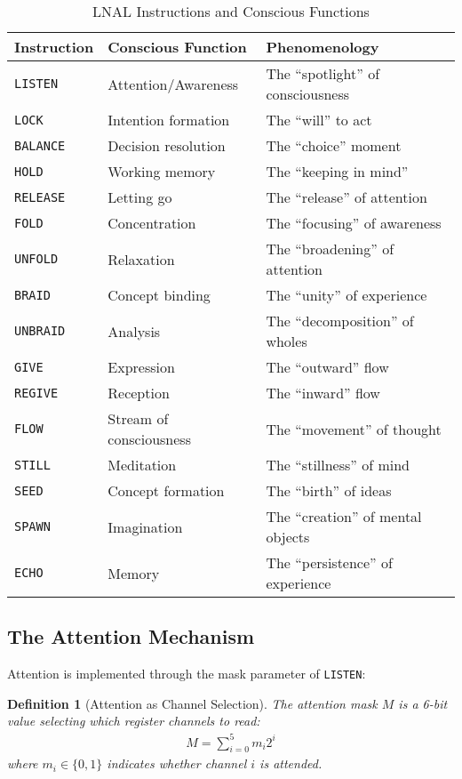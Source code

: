 \documentclass[12pt,a4paper]{article}
\newtheorem{definition}[theorem]{Definition}
\newcommand{\opcmd}[1]{\texttt{#1}}
\begin{document}
\begin{table}[H]
\centering
\caption{LNAL Instructions and Conscious Functions}
\begin{tabular}{lll}
\toprule
\textbf{Instruction} & \textbf{Conscious Function} & \textbf{Phenomenology} \\
\midrule
\opcmd{LISTEN} & Attention/Awareness & The ``spotlight'' of consciousness \\
\opcmd{LOCK} & Intention formation & The ``will'' to act \\
\opcmd{BALANCE} & Decision resolution & The ``choice'' moment \\
\opcmd{HOLD} & Working memory & The ``keeping in mind'' \\
\opcmd{RELEASE} & Letting go & The ``release'' of attention \\
\opcmd{FOLD} & Concentration & The ``focusing'' of awareness \\
\opcmd{UNFOLD} & Relaxation & The ``broadening'' of attention \\
\opcmd{BRAID} & Concept binding & The ``unity'' of experience \\
\opcmd{UNBRAID} & Analysis & The ``decomposition'' of wholes \\
\opcmd{GIVE} & Expression & The ``outward'' flow \\
\opcmd{REGIVE} & Reception & The ``inward'' flow \\
\opcmd{FLOW} & Stream of consciousness & The ``movement'' of thought \\
\opcmd{STILL} & Meditation & The ``stillness'' of mind \\
\opcmd{SEED} & Concept formation & The ``birth'' of ideas \\
\opcmd{SPAWN} & Imagination & The ``creation'' of mental objects \\
\opcmd{ECHO} & Memory & The ``persistence'' of experience \\
\bottomrule
\end{tabular}
\end{table}

\subsection{The Attention Mechanism}

Attention is implemented through the mask parameter of \opcmd{LISTEN}:

\begin{definition}[Attention as Channel Selection]
The attention mask $M$ is a 6-bit value selecting which register channels to read:
\begin{align}
M = \sum_{i=0}^{5} m_i 2^i
\end{align}
where $m_i \in \{0,1\}$ indicates whether channel $i$ is attended.
\end{definition}
\end{document}
